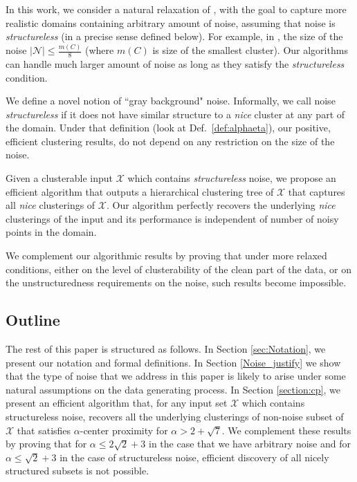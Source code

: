 \documentclass[orivec]{llncs}
\newcommand{\mc}{\mathcal}
\begin{document}
In this work, we consider a natural relaxation of \cite{balcan2012clustering,ben2014clustering}, with the goal to capture more realistic domains containing arbitrary amount of noise, assuming that noise is \emph{structureless} (in a precise sense defined below). For example, in \cite{balcan2012clustering}, the size of the noise $|\mc N| \le \frac{m(C)}{8}$ (where $m(C)$ is size of the smallest cluster). Our algorithms can handle much larger amount of noise as long as they satisfy the {\it structureless} condition.

We define a novel notion of ``gray background" noise. Informally, we call noise {\em structureless} if it does not have similar structure to a {\em nice} cluster at any part of the domain. Under that definition (look at Def.~\ref{def:alphaeta}), our positive, efficient clustering results, do not depend on any restriction on the size of the noise. 

Given a clusterable input $\mc X$ which contains {\em structureless} noise, we propose an efficient algorithm that outputs a hierarchical clustering tree of $\mc X$ that captures all {\em nice} clusterings of $\mc X$. Our algorithm perfectly recovers the underlying {\em nice} clusterings of the input and its performance is independent of number of noisy points in the domain. 

We complement our algorithmic results by proving that under more relaxed conditions, either on the level of clusterability of the clean part of the data, or on the unstructuredness requirements on the noise, such results become impossible. 


\subsection{Outline}
The rest of this paper is structured as follows. In Section \ref{sec:Notation}, we present our notation and formal definitions. In Section \ref{Noise_justify} we show that the type of noise that we address in this paper is likely to arise under some natural assumptions on the data generating process. In Section \ref{section:cp}, we present an efficient algorithm that, for any input set $\mc X$ which contains structureless noise, recovers all the underlying clusterings of non-noise subset of $\mc X$ that satisfies $\alpha$-center proximity for $\alpha > 2+\sqrt{7}$. We complement these results by proving that for $\alpha \leq 2\sqrt{2}+3$ in the case that we have arbitrary noise and for $\alpha \leq \sqrt{2}+3$ in the case of structureless noise, efficient discovery of all nicely structured subsets is not possible.
\end{document}
